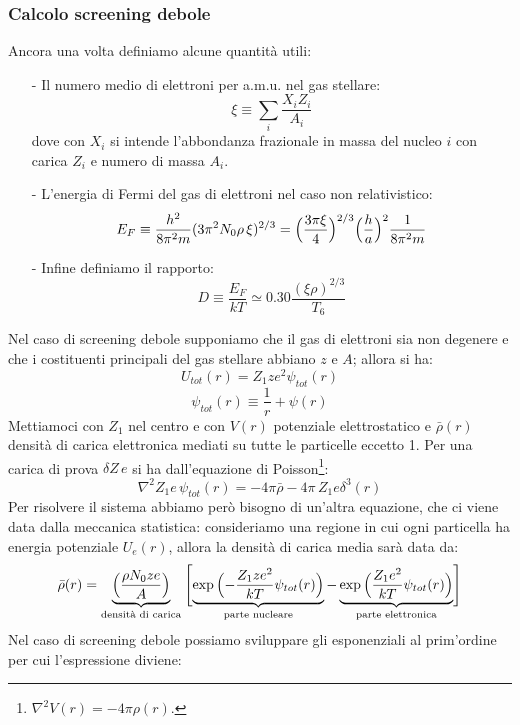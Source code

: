 \subsubsection{Calcolo screening debole}
Ancora una volta definiamo alcune quantità utili:
\begin{itemize}
    \item[-] Il numero medio di elettroni per a.m.u. nel gas stellare: 
    $$\xi \equiv \sum_i \frac{X_iZ_i}{A_i}$$
    dove con $X_i$ si intende l'abbondanza frazionale in massa del nucleo $i$ con carica $Z_i$ e numero di massa $A_i$.
    \item[-] L'energia di Fermi del gas di elettroni nel caso non relativistico:
    $$E_F \equiv \frac{h^2}{8\pi^2 m}(3\pi^2N_0\rho\, \xi)^{2/3} = \Bigl ( \frac{3\pi\xi}{4} \Bigr )^{2/3} \Bigl ( \frac{h}{a} \Bigr )^2 \frac{1}{8\pi^2m}$$
    \item[-] Infine definiamo il rapporto:
    $$D\equiv \frac{E_F}{kT} \simeq 0.30 \frac{(\xi\rho)^{2/3}}{T_6}$$
\end{itemize}
Nel caso di screening debole supponiamo che il gas di elettroni sia non degenere e che i costituenti principali del gas stellare abbiano $z$ e $A$; allora si ha:
$$U_{tot}(r) = Z_1 z e^2 \psi_{tot}(r)$$
$$\psi_{tot}(r) \equiv \frac{1}{r} + \psi(r)$$
Mettiamoci con $Z_1$ nel centro e con $V(r)$ potenziale elettrostatico e $\bar{\rho}(r)$ densità di carica elettronica mediati su tutte le particelle eccetto 1. Per una carica di prova $\delta Z\,e$ si ha dall'equazione di Poisson\footnote{$\nabla^2 V(r) = -4\pi{\rho}(r)$.}:
\begin{equation}\label{0329_poisson}
    \nabla^2 Z_1 e\,\psi_{tot}(r) = -4\pi\bar{\rho} -4\pi \,Z_1 e\delta^{3}(r)
\end{equation}
Per risolvere il sistema abbiamo però bisogno di un'altra equazione, che ci viene data dalla meccanica statistica:
consideriamo una regione in cui ogni particella ha energia potenziale $U_e(r)$, allora la densità di carica media sarà data da:
\begin{equation*}
    \bar{\rho} (r) = \underbrace{\Bigl ( \frac{\rho N_0ze}{A} \Bigr )}_\text{densità di carica}\:\Biggl [ \underbrace{\exp{\Bigl ( -\frac{Z_1ze^2}{kT}\psi_{tot}(r) \Bigr )}}_\text{parte nucleare} - \underbrace{\exp{\Bigl ( \frac{Z_1e^2}{kT}\psi_{tot}(r) \Bigr )}}_\text{parte elettronica} \Biggr ]
\end{equation*}
Nel caso di screening debole possiamo sviluppare gli esponenziali al prim'ordine per cui l'espressione diviene:
